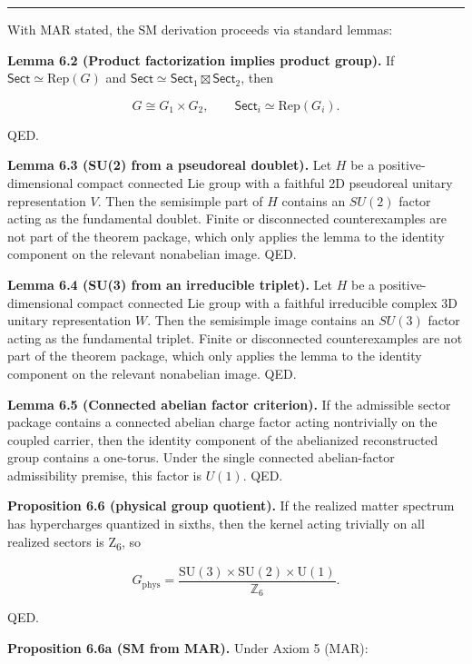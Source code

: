 \begin{center}\rule{0.5\linewidth}{0.5pt}\end{center}

With MAR stated, the SM derivation proceeds via standard lemmas:

\textbf{Lemma 6.2 (Product factorization implies product group).} If \(\mathsf{Sect} \simeq \mathrm{Rep}(G)\) and \(\mathsf{Sect} \simeq \mathsf{Sect}_1 \boxtimes \mathsf{Sect}_2\), then

\[
G \cong G_1 \times G_2,
\qquad
\mathsf{Sect}_i \simeq \mathrm{Rep}(G_i).
\]

QED.

\textbf{Lemma 6.3 (SU(2) from a pseudoreal doublet).} Let \(H\) be a positive-dimensional compact connected Lie group with a faithful 2D pseudoreal unitary representation \(V\). Then the semisimple part of \(H\) contains an \(SU(2)\) factor acting as the fundamental doublet. Finite or disconnected counterexamples are not part of the theorem package, which only applies the lemma to the identity component on the relevant nonabelian image. QED.

\textbf{Lemma 6.4 (SU(3) from an irreducible triplet).} Let \(H\) be a positive-dimensional compact connected Lie group with a faithful irreducible complex 3D unitary representation \(W\). Then the semisimple image contains an \(SU(3)\) factor acting as the fundamental triplet. Finite or disconnected counterexamples are not part of the theorem package, which only applies the lemma to the identity component on the relevant nonabelian image. QED.

\textbf{Lemma 6.5 (Connected abelian factor criterion).} If the admissible sector package contains a connected abelian charge factor acting nontrivially on the coupled carrier, then the identity component of the abelianized reconstructed group contains a one-torus. Under the single connected abelian-factor admissibility premise, this factor is \(U(1)\). QED.

\textbf{Proposition 6.6 (physical group quotient).} If the realized matter spectrum has hypercharges quantized in sixths, then the kernel acting trivially on all realized sectors is Z\textsubscript{6}, so

\[
G_{\mathrm{phys}} = \frac{\mathrm{SU}(3)\times \mathrm{SU}(2)\times \mathrm{U}(1)}{\mathbb Z_6}.
\]

QED.

\textbf{Proposition 6.6a (SM from MAR).} Under Axiom 5 (MAR):

